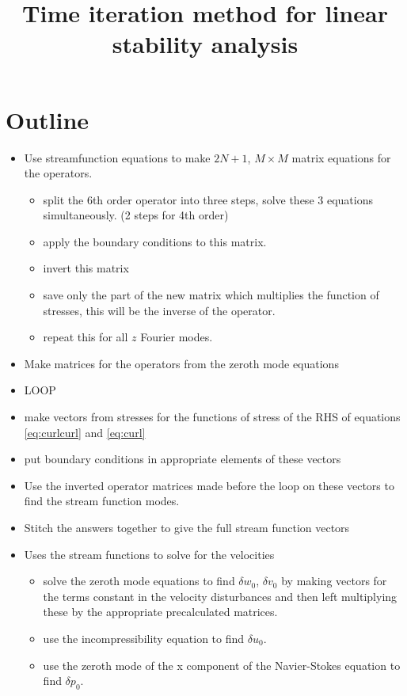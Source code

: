 \documentclass[12pt,a4paper]{article}
\newcommand{\su}{\delta u}
\newcommand{\sv}{\delta v}
\newcommand{\sw}{\delta w}
\newcommand{\spr}{\delta p}
\begin{document}
\title{Time iteration method for linear stability analysis}
\maketitle

\section{Outline}
\begin{itemize}
    \item Use streamfunction equations to make $2N+1$, $M\times M$ matrix equations for the operators.
    \begin{itemize}
	\item split the 6th order operator into three steps, solve these 3 equations simultaneously. (2 steps for 4th order)
	\item apply the boundary conditions to this matrix.
	\item invert this matrix
	\item save only the part of the new matrix which multiplies the function of stresses, this will be the inverse of the operator.
	\item repeat this for all $z$ Fourier modes.
    \end{itemize}
    \item Make matrices for the operators from the zeroth mode equations
    \item LOOP
    \item make vectors from stresses for the functions of stress of the RHS of equations \ref{eq:curlcurl} and \ref{eq:curl}
    \item put boundary conditions in appropriate elements of these vectors
    \item Use the inverted operator matrices made before the loop on these vectors to find the stream function modes. 
    \item Stitch the answers together to give the full stream function vectors
    \item Uses the stream functions to solve for the velocities
	\begin{itemize}
	    \item solve the zeroth mode equations to find $\sw_{0}$, $\sv_{0}$ by making vectors for the terms constant in the velocity disturbances and then left multiplying these by the appropriate precalculated matrices.
	    \item use the incompressibility equation to find $\su_{0}$.
	    \item use the zeroth mode of the x component of the Navier-Stokes equation to find $\spr_{0}$.

\end{itemize}
\end{itemize}
\end{document}
